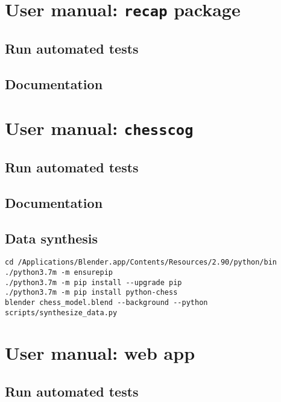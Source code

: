 \documentclass[../../report.tex]{subfiles}
\begin{document}
\chapter{User manual: \texttt{recap} package}
\label{chap:user_man_recap}

\section{Run automated tests}
\label{sec:recap_tests}

\section{Documentation}
\label{sec:recap_documentation}

\chapter{User manual: \texttt{chesscog}}
\label{chap:user_man_chesscog}

\section{Run automated tests}
\label{sec:chesscog_tests}

\section{Documentation}
\label{sec:chesscog_documentation}

\section{Data synthesis}
\label{sec:user_man_chesscog_data_synthesis}
\begin{verbatim}
cd /Applications/Blender.app/Contents/Resources/2.90/python/bin
./python3.7m -m ensurepip
./python3.7m -m pip install --upgrade pip
./python3.7m -m pip install python-chess
blender chess_model.blend --background --python scripts/synthesize_data.py
\end{verbatim}

\chapter{User manual: web app}
\label{chap:user_man_chesscogapp}

\section{Run automated tests}
\label{sec:chesscogapp_tests}
\end{document}
